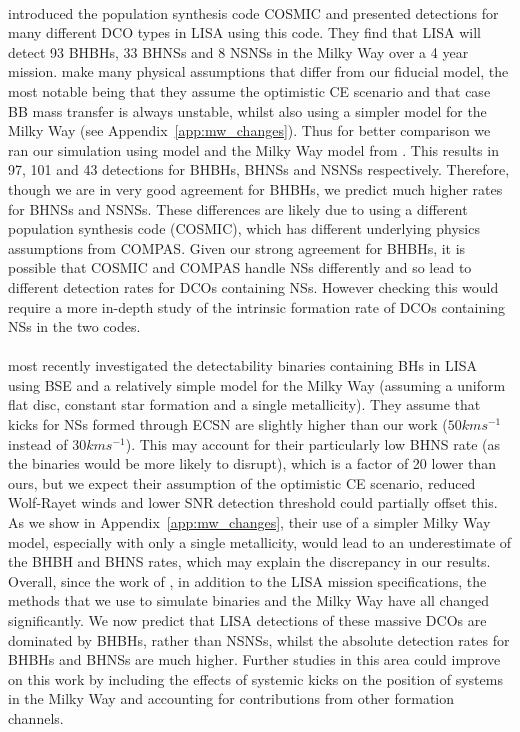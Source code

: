 \paragraph{\citet{Breivik+2020}} introduced the population synthesis code COSMIC and presented detections for many different DCO types in LISA using this code. They find that LISA will detect 93 BHBHs, 33 BHNSs and 8 NSNSs in the Milky Way over a 4 year mission. \citet{Breivik+2020} make many physical assumptions that differ from our fiducial model, the most notable being that they assume the optimistic CE scenario and that case BB mass transfer is always unstable, whilst also using a simpler model for the Milky Way (see Appendix~\ref{app:mw_changes}). Thus for better comparison we ran our simulation using model \modCaseBBOpt{} and the Milky Way model from \citet{Breivik+2020}. This results in 97, 101 and 43 detections for BHBHs, BHNSs and NSNSs respectively. Therefore, though we are in very good agreement for BHBHs, we predict much higher rates for BHNSs and NSNSs. These differences are likely due to using a different population synthesis code (COSMIC), which has different underlying physics assumptions from COMPAS. Given our strong agreement for BHBHs, it is possible that COSMIC and COMPAS handle NSs differently and so lead to different detection rates for DCOs containing NSs. However checking this would require a more in-depth study of the intrinsic formation rate of DCOs containing NSs in the two codes.

\paragraph{\citet{Shao+2021}} most recently investigated the detectability binaries containing BHs in LISA using BSE and a relatively simple model for the Milky Way (assuming a uniform flat disc, constant star formation and a single metallicity). They assume that kicks for NSs formed through ECSN are slightly higher than our work ($50 \unit{km}{s^{-1}}$ instead of $30 \unit{km}{s^{-1}}$). This may account for their particularly low BHNS rate (as the binaries would be more likely to disrupt), which is a factor of 20 lower than ours, but we expect their assumption of the optimistic CE scenario, reduced Wolf-Rayet winds and lower SNR detection threshold could partially offset this. As we show in Appendix~\ref{app:mw_changes}, their use of a simpler Milky Way model, especially with only a single metallicity, would lead to an underestimate of the BHBH and BHNS rates, which may explain the discrepancy in our results.\\

\noindent{}Overall, since the work of \citet{Nelemans+2001}, in addition to the LISA mission specifications, the methods that we use to simulate binaries and the Milky Way have all changed significantly. We now predict that LISA detections of these massive DCOs are dominated by BHBHs, rather than NSNSs, whilst the absolute detection rates for BHBHs and BHNSs are much higher. Further studies in this area could improve on this work by including the effects of systemic kicks on the position of systems in the Milky Way and accounting for contributions from other formation channels.